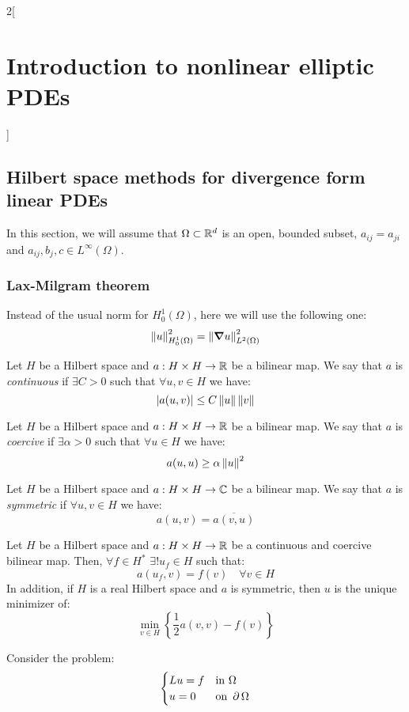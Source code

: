 \documentclass[../../../main_math.tex]{subfiles}
\begin{document}
\begin{multicols}{2}[\section{Introduction to nonlinear elliptic PDEs}]
  \subsection{Hilbert space methods for divergence form linear PDEs}
  In this section, we will assume that $\Omega\subset\RR^d$ is an open, bounded subset, $a_{ij}=a_{ji}$ and $a_{ij},b_j,c\in L^\infty(\Omega)$.
  \subsubsection{Lax-Milgram theorem}
  \begin{remark}
    Instead of the usual norm for $H_0^1(\Omega)$, here we will use the following one:
    $$
      \norm{u}_{H_0^1(\Omega)}^2=\norm{\grad u}_{L^2(\Omega)}^2
    $$
  \end{remark}
  \begin{definition}
    Let $H$ be a Hilbert space and $a:H\times H\rightarrow\RR$ be a bilinear map. We say that $a$ is \emph{continuous} if $\exists C>0$ such that $\forall u,v\in H$ we have: $$\abs{a(u,v)}\leq C\norm{u}\norm{v}$$
  \end{definition}
  \begin{definition}
    Let $H$ be a Hilbert space and $a:H\times H\rightarrow\RR$ be a bilinear map. We say that $a$ is \emph{coercive} if $\exists\alpha>0$ such that $\forall u\in H$ we have: $$a(u,u)\geq\alpha\norm{u}^2$$
  \end{definition}
  \begin{definition}
    Let $H$ be a Hilbert space and $a:H\times H\rightarrow\CC$ be a bilinear map. We say that $a$ is \emph{symmetric} if $\forall u,v\in H$ we have: $$a(u,v)=\overline{a(v,u)}$$
  \end{definition}
  \begin{theorem}\label{INEPDE:laxmilgram}
    Let $H$ be a Hilbert space and $a:H\times H\rightarrow\RR$ be a continuous and coercive bilinear map. Then, $\forall f\in H^*$ $\exists! u_f\in H$ such that: $$a(u_f,v)=f(v)\quad \forall v\in H$$
    In addition, if ${H}$ is a real Hilbert space and $a$ is symmetric, then $u$ is the unique minimizer of:
    $$\min_{v\in H}\left\{\frac{1}{2}a(v,v)-f(v)\right\}$$
  \end{theorem}
  \begin{proposition}
    Consider the problem:
    $$
      \begin{cases}
        L u=f & \text{in }\Omega      \\
        u=0   & \text{on }\Fr{\Omega}

\end{cases}$$
\end{proposition}
\end{multicols}
\end{document}
